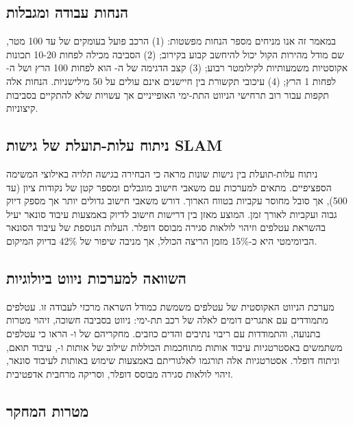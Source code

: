\subsection{הנחות עבודה ומגבלות}
\label{sec:assumptions}

במאמר זה אנו מניחים מספר הנחות מפשטות: (1) הרכב פועל בעומקים של עד 100 מטר, שם מודל מהירות הקול יכול להיחשב קבוע בקירוב; (2) הסביבה מכילה לפחות 10-20 תכונות אקוסטיות משמעותיות לקילומטר רבוע; (3) קצב הדגימה של ה- הוא לפחות 100 הרץ ושל ה- לפחות 1 הרץ; (4) עיכובי תקשורת בין חיישנים אינם עולים על 50 מילישניות. הנחות אלה תקפות עבור רוב תרחישי הניווט התת-ימי האופייניים אך עשויות שלא להתקיים בסביבות קיצוניות.

\subsection{ניתוח עלות-תועלת של גישות SLAM}
\label{sec:cost_benefit}

ניתוח עלות-תועלת בין גישות  שונות מראה כי הבחירה בגישה תלויה באילוצי המשימה הספציפיים.  מתאים למערכות עם משאבי חישוב מוגבלים ומספר קטן של נקודות ציון (עד 500), אך סובל מחוסר עקביות בטווח הארוך.  דורש משאבי חישוב גדולים יותר אך מספק דיוק גבוה ועקביות לאורך זמן.  המוצע מאזן בין דרישות חישוב לדיוק באמצעות עיבוד סונאר יעיל בהשראת עטלפים וזיהוי לולאות סגירה מבוסס דופלר. העלות הנוספת של עיבוד הסונאר הביומימטי היא כ-15\% מזמן הריצה הכולל, אך מניבה שיפור של 42\% בדיוק המיקום.

\subsection{השוואה למערכות ניווט ביולוגיות}
\label{sec:bio_comparison}

מערכת הניווט האקוסטית של עטלפים משמשת כמודל השראה מרכזי לעבודה זו. עטלפים מתמודדים עם אתגרים דומים לאלה של רכב תת-ימי: ניווט בסביבה חשוכה, זיהוי מטרות בתנועה, והתמודדות עם ריבוי נתיבים והדים כוזבים. מחקריהם של \citet{MossEcholocation} ו-\citet{Schuller1974DSC} הראו כי עטלפים משתמשים באסטרטגיות עיבוד אותות מתוחכמות הכוללות שילוב של אותות  ו-, עיבוד תואם, וניתוח דופלר. אסטרטגיות אלה תורגמו לאלגוריתם  באמצעות שימוש באותות  לעיבוד סונאר, זיהוי לולאות סגירה מבוסס דופלר, וסריקה מרחבית אדפטיבית.

\subsection{מטרות המחקר}
\label{sec:research_goals}

